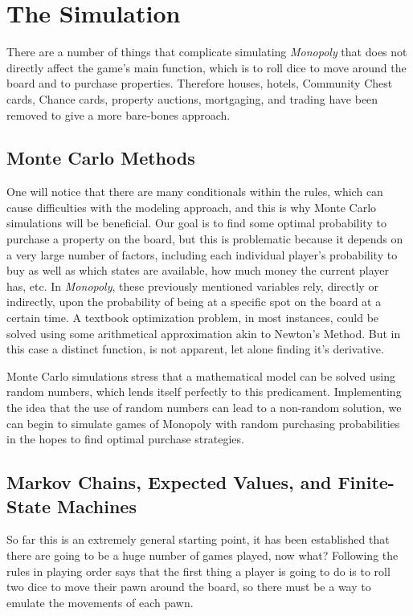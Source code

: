 \documentclass{article}
\begin{document}
\section{The Simulation}

There are a number of things that complicate simulating \textit{Monopoly} that does not directly affect the game’s main function, which is to roll dice to move around the board and to purchase properties.  Therefore houses, hotels, Community Chest cards, Chance cards, property auctions, mortgaging, and trading have been removed to give a more bare-bones approach.

\subsection{Monte Carlo Methods}

One will notice that there are many conditionals within the rules, which can cause difficulties with the modeling approach, and this is why Monte Carlo simulations will be beneficial.  Our goal is to find some optimal probability to purchase a property on the board, but this is problematic because it depends on a very large number of factors, including each individual player’s probability to buy as well as which states are available, how much money the current player has, etc.  In \textit{Monopoly}, these previously mentioned variables rely, directly or indirectly, upon the probability of being at a specific spot on the board at a certain time.  A textbook optimization problem, in most instances, could be solved using some arithmetical approximation akin to Newton's Method.  But in this case a distinct function,  is not apparent, let alone finding it's derivative.

Monte Carlo simulations stress that a mathematical model can be solved using random numbers, which lends itself perfectly to this predicament.  Implementing the idea that the use of random numbers can lead to a non-random solution, we can begin to simulate games of Monopoly with random purchasing probabilities in the hopes to find optimal purchase strategies.

\subsection{Markov Chains, Expected Values, and Finite-State Machines}

So far this is an extremely general starting point, it has been established that there are going to be a huge number of games played, now what?  Following the rules in playing order says that the first thing a player is going to do is to roll two dice to move their pawn around the board, so there must be a way to emulate the movements of each pawn.
\end{document}
